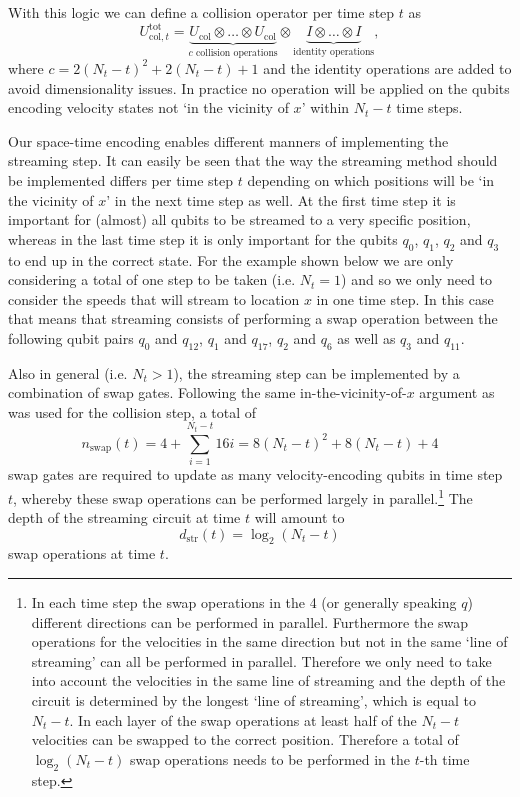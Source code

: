 With this logic we can define a collision operator per time step $t$ as
\begin{equation}
U_{\text{col},t}^\text{tot}=\underbrace{U_\text{col} \otimes \dots \otimes U_\text{col}}_{\text{$c$  collision operations}} \otimes \underbrace{I \otimes \dots \otimes I}_{\text{identity operations}},
\end{equation}
where $c = 2(N_t-t)^2 + 2(N_t-t) +1$ and the identity operations are added to avoid dimensionality issues. In practice no operation will be applied on the qubits encoding velocity states not `in the vicinity of $x$' within $N_t-t$ time steps. 

Our space-time encoding enables different manners of implementing the streaming step. It can easily be seen that the way the streaming method should be implemented differs per time step $t$ depending on which positions will be `in the vicinity of $x$' in the next time step as well. At the first time step it is important for (almost) all qubits to be streamed to a very specific position, whereas in the last time step it is only important for the qubits $q_0$, $q_1$, $q_2$ and $q_3$ to end up in the correct state. For the example shown below we are only considering a total of one step to be taken (i.e. $N_t=1$) and so we only need to consider the speeds that will stream to location $x$ in one time step. In this case that means that streaming consists of performing a swap operation between the following qubit pairs $q_0$ and $q_{12}$, $q_1$ and $q_{17}$, $q_2$ and $q_6$ as well as $q_3$ and $q_{11}$.  

Also in general (i.e. $N_t>1$), the streaming step can be implemented by a combination of swap gates. Following the same in-the-vicinity-of-$x$ argument as was used for the collision step, a total of 
\begin{equation}
n_\text{swap}(t) = 4+\sum_{i=1}^{N_t-t }16i = 8 \left ( N_t - t \right )^2 + 8\left ( N_t - t \right ) +4
\end{equation}
swap gates are required to update as many velocity-encoding qubits in time step $t$, whereby these swap operations can be performed largely in parallel.\footnote{In each time step the swap operations in the 4 (or generally speaking $q$) different directions can be performed in parallel. Furthermore the swap operations for the velocities in the same direction but not in the same `line of streaming' can all be performed in parallel. Therefore we only need to take into account the velocities in the same line of streaming and the depth of the circuit is determined by the longest `line of streaming', which is equal to $N_t-t$. In each layer of the swap operations at least half of the $N_t-t$ velocities can be swapped to the correct position. Therefore a total of $\log_2 \left (N_t-t \right )$ swap operations needs to be performed in the $t$-th time step.}
The depth of the streaming circuit at time $t$ will amount to 
\begin{equation}
    d_\text{str}(t) = \log_2 \left ( N_t-t \right )
\end{equation}
swap operations at time $t$. 


